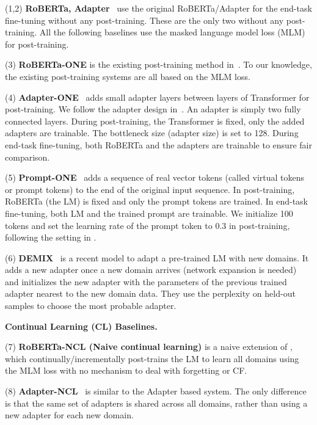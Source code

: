 \documentclass[11pt]{article}
\begin{document}
(1,2) \textbf{RoBERTa, Adapter}~\cite{DBLP:journals/corr/abs-1907-11692,Houlsby2019Parameter} use the original RoBERTa/Adapter for the end-task fine-tuning without any post-training. These are the only two without any post-training. All the following baselines use the masked language model loss (MLM) for post-training. 

(3) \textbf{RoBERTa-ONE} is the existing post-training method in~\cite{DBLP:conf/acl/GururanganMSLBD20}. To our knowledge, the existing post-training systems are all based on the MLM loss. 

(4) \textbf{ Adapter-ONE}~\cite{madotto2020continual,Houlsby2019Parameter} adds small adapter layers between layers of Transformer for post-training. We follow the adapter design in~\cite{madotto2020continual,Houlsby2019Parameter}. An adapter is simply two fully connected layers. During post-training, the Transformer is fixed, only the added adapters are trainable. The bottleneck size (adapter size) is set to 128. 
During end-task fine-tuning, both RoBERTa and the adapters are trainable to ensure fair comparison.


(5) \textbf{Prompt-ONE}~\cite{DBLP:conf/emnlp/LesterAC21} adds a sequence of real vector tokens (called virtual tokens or prompt tokens) to the end of the original input sequence. In post-training, RoBERTa (the LM) is fixed and only the prompt tokens are trained. In end-task fine-tuning, both LM and the trained prompt are trainable. We initialize 100 tokens and set the learning rate of the prompt token to 0.3 in post-training, following the setting in \cite{DBLP:conf/emnlp/LesterAC21}. 

(6) \textbf{DEMIX}~\cite{gururangan2021demix} is a recent model to adapt a pre-trained LM with new domains. It adds a new adapter once a new domain arrives (network expansion is needed) and initializes the new adapter with the parameters of the previous trained adapter nearest to the new domain data. They use the perplexity on held-out samples to choose the most probable adapter. 


\textbf{Continual Learning (CL) Baselines.}


(7) \textbf{RoBERTa-NCL (Naive continual learning)} is a naive extension of \cite{DBLP:conf/acl/GururanganMSLBD20}, which continually/incrementally post-trains the LM to learn all domains using the MLM loss with no mechanism to deal with forgetting or CF.

(8) \textbf{Adapter-NCL}~\cite{Houlsby2019Parameter} is similar to the Adapter based system. The only difference is that the same set of adapters is shared across all domains, rather than using a new adapter for each new domain.
\end{document}

